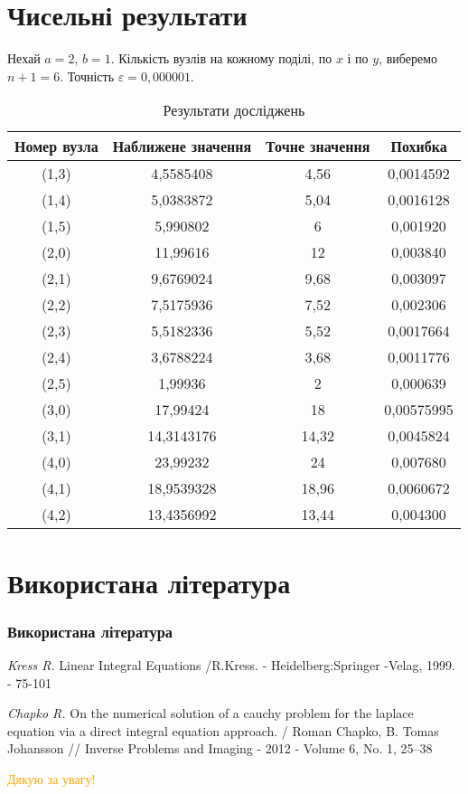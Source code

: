 \documentclass[10pt]{beamer}
\begin{document}
\section{Чисельні результати}
\begin{frame}
Нехай $a=2$, $b=1$. Кількість вузлів на кожному поділі, по $x$ і по $y$, виберемо $n+1 = 6$. Точність $\varepsilon = 0,000001$.
\begin{table}[h]
\caption{Результати досліджень}
\begin{center}
\begin{tabular}{|c|c|c|c|}
\hline
Номер вузла & Наближене значення&Точне значення& Похибка \\
\hline
(1,3)&4,5585408 &4,56&0,0014592\\
(1,4)&5,0383872 &5,04&0,0016128\\
(1,5)&5,990802 &6&0,001920\\
(2,0)&11,99616 &12&0,003840\\
(2,1)&9,6769024 &9,68&0,003097\\
(2,2)&7,5175936 &7,52&0,002306\\
(2,3)&5,5182336 &5,52&0,0017664\\
(2,4)&3,6788224 &3,68&0,0011776\\
(2,5)&1,99936 &2&0,000639\\
(3,0)&17,99424 &18&0,00575995\\
(3,1)&14,3143176 &14,32&0,0045824\\
(4,0)&23,99232 &24&0,007680\\
(4,1)&18,9539328 &18,96&0,0060672\\
(4,2)&13,4356992 &13,44&0,004300\\
\hline
\end{tabular}
\end{center}
\end{table}
\end{frame}

\section{Використана література}
\begin{frame}
\frametitle{Використана література}
\renewcommand{\bibname}{Список використаної літератури}
\begin{thebibliography}{99}

\emph{Kress R.} Linear Integral Equations /R.Kress. - Heidelberg:Springer -Velag, 1999. - 75-101

\emph{Chapko R.} On the numerical solution of a cauchy problem for the laplace equation via a direct integral equation approach. / Roman Chapko, B. Tomas Johansson // Inverse Problems and Imaging - 2012 - Volume 6, No. 1, 25–38
\end{thebibliography}

\end{frame}

\begin{frame}
\begin{center}
\Huge{\textcolor{orange}{Дякую за увагу!}}
\end{center}
\end{frame}
\end{document}
